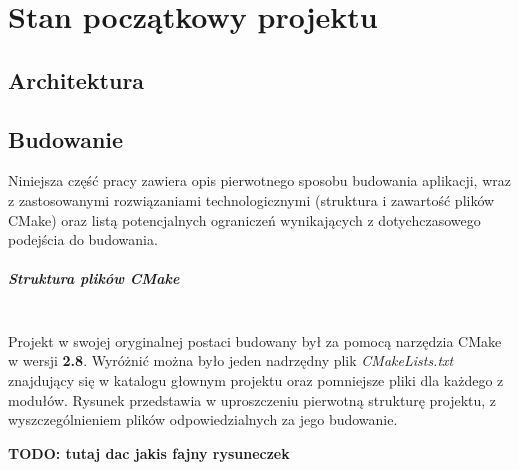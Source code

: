 
\chapter{Stan początkowy projektu}
\label{cha:pocz}

\section{Architektura}

\section{Budowanie} 
Niniejsza część pracy zawiera opis pierwotnego sposobu budowania aplikacji, wraz z zastosowanymi rozwiązaniami technologicznymi (struktura i zawartość plików CMake) oraz listą potencjalnych ograniczeń wynikających z dotychczasowego podejścia do budowania.

\paragraph*{Struktura plików CMake}\mbox{}\\
Projekt w swojej oryginalnej postaci budowany był za pomocą narzędzia CMake w wersji \textbf{2.8}. Wyróżnić można było jeden nadrzędny plik \textit{CMakeLists.txt} znajdujący się w katalogu głownym projektu oraz pomniejsze pliki dla każdego z modułów. Rysunek przedstawia w uproszczeniu pierwotną strukturę projektu, z wyszczególnieniem plików odpowiedzialnych za jego budowanie.

\textbf{TODO: tutaj dac jakis fajny rysuneczek}












